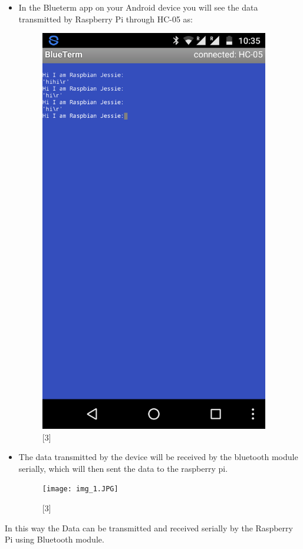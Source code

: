 \documentclass[11pt,a4paper]{article}
\begin{document}
\begin{itemize}
		
		\newpage
		\item In the Blueterm app on your Android device you will see the data transmitted by Raspberry Pi through HC-05 as:
		\newline 
		\begin{figure}[h!]
			\includegraphics[width=10cm]{img_2.JPG}
			\centering
			\caption{[3]}
		\end{figure} 
		\newline
		\item The data transmitted by the device will be received by the bluetooth module serially, which will then sent the data to the raspberry pi.
		 \begin{figure}[h!]
		 	\texttt{[image: img\_1.JPG]}
		 	\centering
		 	\caption{[3]}
		 \end{figure}  
	\end{itemize}
	In this way the Data can be transmitted and received serially by the Raspberry Pi using Bluetooth module.
	
\end{document}
